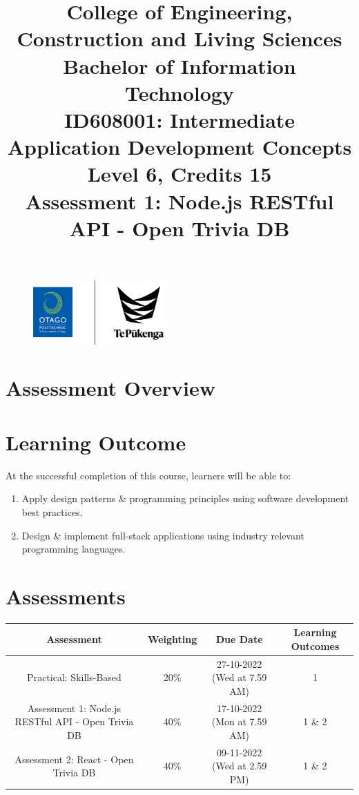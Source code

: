 \documentclass{article}
\author{}
\begin{document}
\begin{figure}
	\centering
	\includegraphics[width=50mm]{../../resources/img/logo.png}
\end{figure}

\title{College of Engineering, Construction and Living Sciences\\Bachelor of Information Technology\\ID608001: Intermediate Application Development Concepts\\Level 6, Credits 15\\\textbf{Assessment 1: Node.js RESTful API - Open Trivia DB}}
\date{}
\maketitle

\section*{Assessment Overview}

\section*{Learning Outcome}
At the successful completion of this course, learners will be able to:
\begin{enumerate}
	\item Apply design patterns \& programming principles using software development best practices.
	\item Design \& implement full-stack applications using industry relevant programming languages.
\end{enumerate}

\section*{Assessments}
\renewcommand{\arraystretch}{1.5}
\begin{tabular}{|c|c|c|c|}
	\hline
	\textbf{Assessment}                                 & \textbf{Weighting} & \textbf{Due Date}            & \textbf{Learning Outcomes} \\ \hline
	\small Practical: Skills-Based & \small 20\%        & \small 27-10-2022 (Wed at 7.59 AM)   & \small 1                   \\ \hline
	\small Assessment 1: Node.js RESTful API - Open Trivia DB              & \small 40\%        & \small 17-10-2022 (Mon at 7.59 AM)  & \small 1 \& 2                   \\ \hline
	\small Assessment 2: React - Open Trivia DB                        & \small 40\%        & \small 09-11-2022 (Wed at 2.59 PM)  & \small 1 \& 2                   \\ \hline
\end{tabular}
\end{document}
